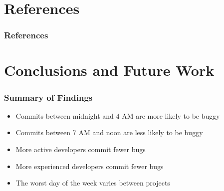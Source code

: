 \documentclass[aspectratio=43]{beamer}
\begin{document}
\section*{References}
\begin{frame}[allowframebreaks]
  \frametitle{References}
  
  
\end{frame}

\section*{Conclusions and Future Work}
\begin{frame}
  \frametitle{Summary of Findings}

  \begin{itemize}
    \item Commits between midnight and 4 AM are more likely to be buggy

    \item Commits between 7 AM and noon are less likely to be buggy

    \item More active developers commit fewer bugs

    \item More experienced developers commit fewer bugs

    \item The worst day of the week varies between projects
  \end{itemize}
\end{frame}
\end{document}
